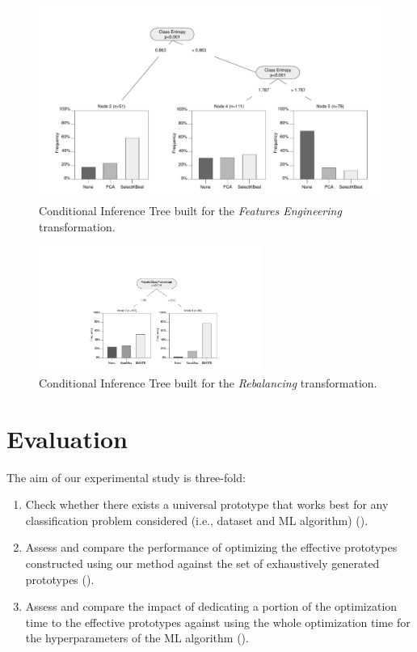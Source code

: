 \begin{figure}[!h]
	\centering
	\includegraphics[clip, trim=1.0cm 0.4cm 1cm 1cm,width=1\textwidth]{chapters/data-centric/supervised/img/tree-FE.pdf}
	\caption{Conditional Inference Tree built for the \textit{Features Engineering} transformation.}
	\label{effective-fig:features-meta-learning:feature-engineering}
\end{figure}

\begin{figure}[!h]
	\centering
	\includegraphics[clip, trim=5.8cm 0.4cm 5.05cm 3.5cm,width=0.65\textwidth]{chapters/data-centric/supervised/img/tree-RE.pdf}
	\caption{Conditional Inference Tree built for the \textit{Rebalancing} transformation.}
	\label{effective-fig:features-meta-learning:rebalancing}
	\end{figure}

\section{Evaluation}
\label{effective-sec:evaluation}


The aim of our experimental study is three-fold:
\begin{enumerate}
    \item Check whether there exists a universal prototype that works best for any classification problem considered  (i.e., dataset and ML algorithm) ().
    \item Assess and compare the performance of optimizing the effective prototypes constructed using our method against the set of exhaustively generated prototypes ().
    \item Assess and compare the impact of dedicating a portion of the optimization time to the effective prototypes against using the whole optimization time for the hyperparameters of the ML algorithm ().
\end{enumerate}

